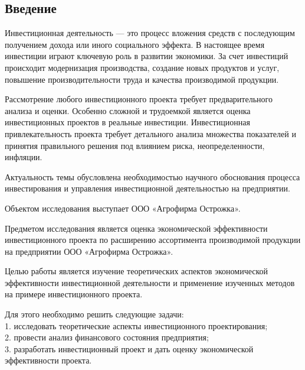 \subsection*{Введение}

Инвестиционная деятельность --- это процесс вложения средств с последующим получением дохода или иного социального эффекта. В настоящее время инвестиции играют ключевую роль в развитии экономики. За счет инвестиций происходит модернизация производства, создание новых продуктов и услуг, повышение производительности труда и качества производимой продукции.

Рассмотрение любого инвестиционного проекта требует предварительного анализа и оценки. Особенно сложной и трудоемкой является оценка инвестиционных проектов в реальные инвестиции. Инвестиционная привлекательность проекта требует детального анализа множества показателей и принятия правильного решения под влиянием риска, неопределенности, инфляции.

Актуальность темы обусловлена необходимостью научного обоснования процесса инвестирования и управления инвестиционной деятельностью на предприятии.

Объектом исследования выступает ООО «Агрофирма Острожка».

Предметом исследования является оценка экономической эффективности инвестиционного проекта по расширению ассортимента производимой продукции на предприятии ООО «Агрофирма Острожка».

Целью работы является изучение теоретических аспектов экономической эффективности инвестиционной деятельности и применение изученных методов на примере инвестиционного проекта.

Для этого необходимо решить следующие задачи:\\
1. исследовать теоретические аспекты инвестиционного проектирования;\\
2. провести анализ финансового состояния предприятия;\\
3. разработать инвестиционный проект и дать оценку экономической эффективности проекта.\\




